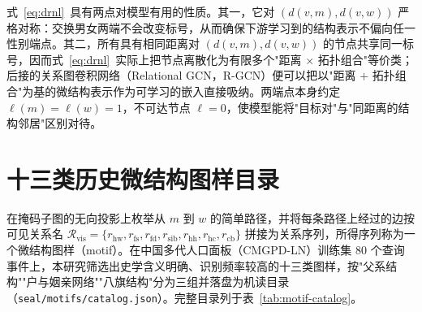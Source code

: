 式~\eqref{eq:drnl}~具有两点对模型有用的性质。其一，它对 $(d(v,m),d(v,w))$ 严格对称：交换男女两端不会改变标号，从而确保下游学习到的结构表示不偏向任一性别端点。其二，所有具有相同距离对 $(d(v,m),d(v,w))$ 的节点共享同一标号，因而式~\eqref{eq:drnl}~实际上把节点离散化为有限多个"距离 $\times$ 拓扑组合"等价类；后接的关系图卷积网络（Relational GCN，R-GCN）便可以把以"距离 $+$ 拓扑组合"为基的微结构表示作为可学习的嵌入直接吸纳。两端点本身约定 $\ell(m)=\ell(w)=1$，不可达节点 $\ell=0$，使模型能将"目标对"与"同距离的结构邻居"区别对待。

\section{十三类历史微结构图样目录}\label{sec:seal-motifs}

在掩码子图的无向投影上枚举从 $m$ 到 $w$ 的简单路径，并将每条路径上经过的边按可见关系名 $\mathcal{R}_\mathrm{vis}=\{r_\mathrm{hw},r_\mathrm{fs},r_\mathrm{fd},r_\mathrm{sib},r_\mathrm{hh},r_\mathrm{hc},r_\mathrm{cb}\}$ 拼接为关系序列，所得序列称为一个微结构图样（motif）。在中国多代人口面板（CMGPD-LN）训练集 80 个查询事件上，本研究筛选出史学含义明确、识别频率较高的十三类图样，按"父系结构""户与姻亲网络""八旗结构"分为三组并落盘为机读目录（\texttt{seal/motifs/catalog.json}）。完整目录列于表~\ref{tab:motif-catalog}。

